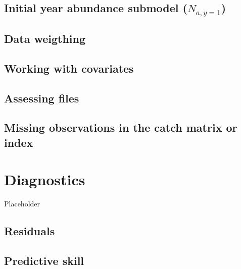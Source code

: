 \documentclass[
]{book}
\begin{document}
\hypertarget{initial-year-abundance-submodel-n_ay1}{%
\section{\texorpdfstring{Initial year abundance submodel (\(N_{a,y=1}\))}{Initial year abundance submodel (N\_\{a,y=1\})}}\label{initial-year-abundance-submodel-n_ay1}}

\hypertarget{data-weigthing}{%
\section{Data weigthing}\label{data-weigthing}}

\hypertarget{working-with-covariates}{%
\section{Working with covariates}\label{working-with-covariates}}

\hypertarget{assessing-files}{%
\section{\texorpdfstring{Assessing \ADMB files}{Assessing files}}\label{assessing-files}}

\hypertarget{missing-observations-in-the-catch-matrix-or-index}{%
\section{Missing observations in the catch matrix or index}\label{missing-observations-in-the-catch-matrix-or-index}}

\hypertarget{diagnostics}{%
\chapter{\texorpdfstring{Diagnostics \label{sec:diagn}}{Diagnostics }}\label{diagnostics}}

Placeholder

\hypertarget{residuals}{%
\section{Residuals}\label{residuals}}

\hypertarget{predictive-skill}{%
\section{Predictive skill}\label{predictive-skill}}
\end{document}
